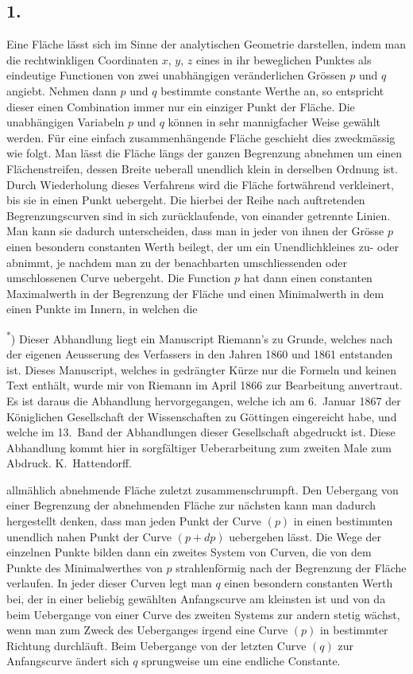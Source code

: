 \documentclass[12pt,a4paper]{article}
\begin{document}
\subsection*{1.}

Eine Fl\"ache l\"asst sich im Sinne der analytischen Geometrie darstellen, indem man die rechtwinkligen Coordinaten $x$, $y$, $z$ eines in ihr beweglichen Punktes als eindeutige Functionen von zwei unabh\"angigen ver\"anderlichen Gr\"ossen $p$ und $q$ angiebt. Nehmen dann $p$ und $q$ bestimmte constante Werthe an, so entspricht dieser einen Combination immer nur ein einziger Punkt der Fl\"ache. Die unabh\"angigen Variabeln $p$ und $q$ k\"onnen in sehr mannigfacher Weise gew\"ahlt werden. F\"ur eine einfach zusammenh\"angende Fl\"ache geschieht dies zweckm\"assig wie folgt. Man l\"asst die Fl\"ache l\"angs der ganzen Begrenzung abnehmen um einen Fl\"achenstreifen, dessen Breite ueberall unendlich klein in derselben Ordnung ist. Durch Wiederholung dieses Verfahrens wird die Fl\"ache fortw\"ahrend verkleinert, bis sie in einen Punkt uebergeht. Die hierbei der Reihe nach auftretenden Begrenzungscurven sind in sich zur\"ucklaufende, von einander getrennte Linien. Man kann sie dadurch unterscheiden, dass man in jeder von ihnen der Gr\"osse $p$ einen besondern constanten Werth beilegt, der um ein Unendlichkleines zu- oder abnimmt, je nachdem man zu der benachbarten umschliessenden oder umschlossenen Curve uebergeht. Die Function $p$ hat dann einen constanten Maximalwerth in der Begrenzung der Fl\"ache und einen Minimalwerth in dem einen Punkte im Innern, in welchen die

\bigskip
\noindent\small\textsuperscript{*}) Dieser Abhandlung liegt ein Manuscript Riemann's zu Grunde, welches nach der eigenen Aeusserung des Verfassers in den Jahren 1860 und 1861 entstanden ist. Dieses Manuscript, welches in gedr\"angter K\"urze nur die Formeln und keinen Text enth\"alt, wurde mir von Riemann im April 1866 zur Bearbeitung anvertraut. Es ist daraus die Abhandlung hervorgegangen, welche ich am 6.\ Januar 1867 der K\"oniglichen Gesellschaft der Wissenschaften zu G\"ottingen eingereicht habe, und welche im 13.\ Band der Abhandlungen dieser Gesellschaft abgedruckt ist. Diese Abhandlung kommt hier in sorgf\"altiger Ueberarbeitung zum zweiten Male zum Abdruck. K.\ Hattendorff.

\newpage
\noindent allm\"ahlich abnehmende Fl\"ache zuletzt zusammenschrumpft. Den Uebergang von einer Begrenzung der abnehmenden Fl\"ache zur n\"achsten kann man dadurch hergestellt denken, dass man jeden Punkt der Curve $(p)$ in einen bestimmten unendlich nahen Punkt der Curve $(p+dp)$ uebergehen l\"asst. Die Wege der einzelnen Punkte bilden dann ein zweites System von Curven, die von dem Punkte des Minimalwerthes von $p$ strahlenf\"ormig nach der Begrenzung der Fl\"ache verlaufen. In jeder dieser Curven legt man $q$ einen besondern constanten Werth bei, der in einer beliebig gew\"ahlten Anfangscurve am kleinsten ist und von da beim Uebergange von einer Curve des zweiten Systems zur andern stetig w\"achst, wenn man zum Zweck des Ueberganges irgend eine Curve $(p)$ in bestimmter Richtung durchl\"auft. Beim Uebergange von der letzten Curve $(q)$ zur Anfangscurve \"andert sich $q$ sprungweise um eine endliche Constante.
\end{document}
